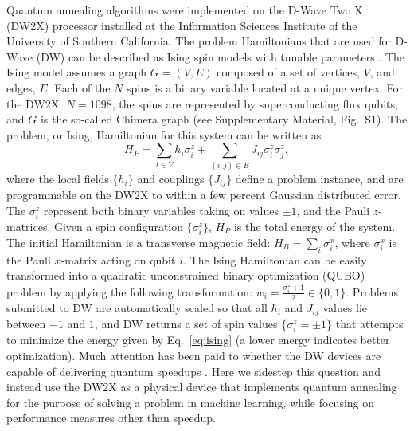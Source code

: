 \documentclass[aps,pra,groupedaddress,nofootinbib,notitlepage,showpacs,floatfix,superscriptaddress]{revtex4-1}
\newcommand{\beq}{\begin{equation}}
\newcommand{\eeq}{\end{equation}}
\begin{document}
Quantum annealing algorithms were implemented on the D-Wave Two X (DW2X) processor installed at the Information Sciences Institute of the University of Southern California. The problem Hamiltonians that are used for D-Wave (DW) can be described as Ising spin models with tunable parameters \cite{Barahona1982}. The Ising model assumes a graph $G = (V,E)$ composed of a set of vertices, $V$, and edges, $E$. Each of the $N$ spins is a binary variable located at a unique vertex. For the DW2X, $N=1098$, the spins are represented by superconducting flux qubits, and $G$ is the so-called Chimera graph (see Supplementary Material, Fig.~S1). The problem, or Ising, Hamiltonian for this system can be written as
%
\beq
H_P = \sum_{i\in V} h_i\sigma_i^z + \sum_{(i,j)\in E}J_{ij}\sigma_i^z\sigma_j^z
\label{eq:ising},
\eeq
where the local fields $\{h_i\}$ and couplings $\{J_{ij}\}$ define a problem instance, and are programmable on the DW2X to within a few percent Gaussian distributed error. The $\sigma_i^z$ represent both binary variables taking on values $\pm 1$, and the Pauli $z$-matrices. Given a spin configuration $\{\sigma^z_i\}$, $H_P$ is the total energy of the system. The initial Hamiltonian is a transverse magnetic field: $H_B = \sum_i \sigma^x_i$, where $\sigma^x_i$ is the Pauli $x$-matrix acting on qubit $i$.
The Ising Hamiltonian can be easily transformed into a quadratic unconstrained binary optimization (QUBO) problem by applying the following transformation: $w_i = \frac{\sigma_i^z+1}{2} \in \{0,1\}$. Problems submitted to DW are automatically scaled so that all $h_i$ and $J_{ij}$ values lie between $-1$ and $1$, and DW returns a set of spin values $\{\sigma_i^z=\pm 1\}$ that attempts to minimize the energy given by Eq.~\eqref{eq:ising} (a lower energy indicates better optimization). Much attention has been paid to  whether the DW devices are capable of delivering quantum speedups \cite{speedup,2014Katzgraber,Venturelli:2014nx,Hen:2015rt,Amin:2015qf}. Here we sidestep this question and instead use the DW2X as a physical device that implements quantum annealing for the purpose of solving a problem in machine learning, while focusing on performance measures other than speedup.
\end{document}
